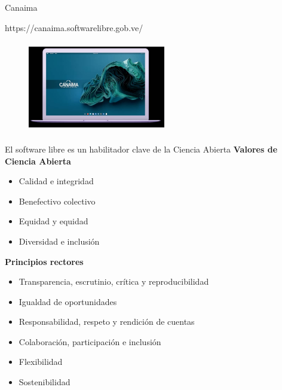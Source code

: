 \documentclass[11pt]{beamer}
\begin{document}
	\begin{frame}{Canaima}	
	
	https://canaima.softwarelibre.gob.ve/
	
	\begin{figure}[h!] 
    				\centering
				\includegraphics[width=6cm, height=4cm]{Canaima.png}
			\end{figure}	
	\end{frame}


	\begin{frame}{El software libre es un habilitador clave de la Ciencia Abierta}
		\textbf {Valores de Ciencia Abierta}
 		\begin{itemize}
			\item Calidad e integridad
			\item Benefectivo colectivo
			\item Equidad y equidad
			\item Diversidad e inclusión
 		\end{itemize}	
		\textbf {Principios rectores}
 		 \begin{itemize}
			\item Transparencia, escrutinio, crítica y reproducibilidad
			\item Igualdad de oportunidades
			\item Responsabilidad, respeto y rendición de cuentas
			\item Colaboración, participación e inclusión
			\item Flexibilidad
			\item Sostenibilidad
 		\end{itemize}
	\end{frame}	
	
\end{document}
